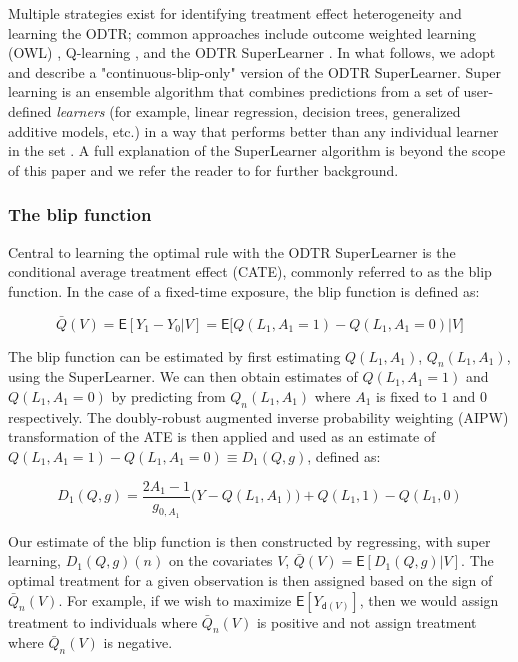 \documentclass[11pt]{article}
\renewcommand{\d}{\mathsf{d}}
\newcommand{\E}{\mathsf{E}}
\begin{document}
Multiple strategies exist for identifying treatment effect heterogeneity and learning the ODTR; common approaches include outcome weighted learning (OWL) \citep{owl2012}, Q-learning \citep{murphyODTR2003,moodieQlearning2012}, and the ODTR SuperLearner \citep{luedtkeSLodtr,MontoyavanderLaanLuedtkeSkeemCoylePetersen2022}. In what follows, we adopt and describe a "continuous-blip-only" \citep{MontoyavanderLaanLuedtkeSkeemCoylePetersen2022} version of the ODTR SuperLearner. Super learning is an ensemble algorithm that combines predictions from a set of user-defined \textit{learners} (for example, linear regression, decision trees, generalized additive models, etc.) in a way that performs better than any individual learner in the set \citep{breimanStacked,van2007super}. A full explanation of the SuperLearner algorithm is beyond the scope of this paper and we refer the reader to \citet{van2007super} for further background.

\subsubsection{The blip function}

Central to learning the optimal rule with the ODTR SuperLearner is the conditional average treatment effect (CATE), commonly referred to as the blip function. In the case of a fixed-time exposure, the blip function is defined as:

\begin{equation}
  \bar{Q}(V) = \E[Y_1 - Y_0 | V] = \E\Big[Q(L_1, A_1 = 1) - Q(L_1, A_1 = 0) \Big| V\Big]  
\end{equation}

The blip function can be estimated by first estimating $Q(L_1, A_1)$, $Q_n(L_1, A_1)$, using the SuperLearner. We can then obtain estimates of $Q(L_1, A_1 = 1)$ and $Q(L_1, A_1 = 0)$ by predicting from $Q_n(L_1, A_1)$ where $A_1$ is fixed to $1$ and $0$ respectively. The doubly-robust augmented inverse probability weighting (AIPW) transformation of the ATE is then applied and used as an estimate of $Q(L_1, A_1 = 1) - Q(L_1, A_1 = 0) \equiv D_1(Q, g)$, defined as: 

\begin{equation}\label{eif1}
  D_1(Q,g) = \frac{2A_1 - 1}{g_{0, A_1}} \Big( Y - Q(L_1, A_1) \Big) + Q(L_1, 1) - Q(L_1, 0)  
\end{equation}

Our estimate of the blip function is then constructed by regressing, with super learning, $D_1(Q, g)(n)$ on the covariates $V$, $\bar{Q}(V) = \E[D_1(Q, g) | V]$. The optimal treatment for a given observation is then assigned based on the sign of $\bar{Q}_n(V)$. For example, if we wish to maximize $\E [Y_{\d(V)}]$, then we would assign treatment to individuals where $\bar{Q}_n(V)$ is positive and not assign treatment where $\bar{Q}_n(V)$ is negative. 
\end{document}
